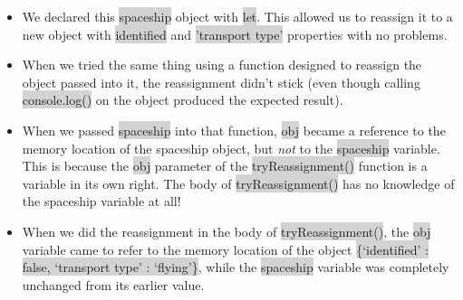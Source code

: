 \documentclass[11pt]{article}
\begin{document}
\begin{itemize}[leftmargin = *]
\item We declared this \colorbox{lightgray}{spaceship} object with \colorbox{lightgray}{let}. This allowed us to reassign it to a new object with \colorbox{lightgray}{identified} and \colorbox{lightgray}{'transport type'} properties with no problems.
\item When we tried the same thing using a function designed to reassign the object passed into it, the reassignment didn’t stick (even though calling \colorbox{lightgray}{console.log()} on the object produced the expected result).
\item When we passed \colorbox{lightgray}{spaceship} into that function, \colorbox{lightgray}{obj} became a reference to the memory location of the spaceship object, but \textit{not} to the \colorbox{lightgray}{spaceship} variable. This is because the \colorbox{lightgray}{obj} parameter of the \colorbox{lightgray}{tryReassignment()} function is a variable in its own right. The body of \colorbox{lightgray}{tryReassignment()} has no knowledge of the spaceship variable at all!
\item When we did the reassignment in the body of \colorbox{lightgray}{tryReassignment()}, the \colorbox{lightgray}{obj} variable came to refer to the memory location of the object \colorbox{lightgray}{\{`identified' : false, `transport type' : `flying'\}}, while the \colorbox{lightgray}{spaceship} variable was completely unchanged from its earlier value.
\end{itemize}
\end{document}
